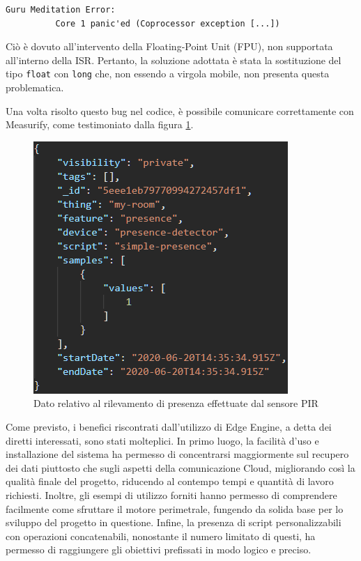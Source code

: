 \begin{verbatim}
Guru Meditation Error: 
          Core 1 panic'ed (Coprocessor exception [...])
\end{verbatim}

Ciò è dovuto all'intervento della Floating-Point Unit (FPU), non supportata all'interno della ISR. Pertanto, la soluzione adottata è stata la sostituzione del tipo \texttt{float} con \texttt{long} che, non essendo a virgola mobile, non presenta questa problematica.

Una volta risolto questo bug nel codice, è possibile comunicare correttamente con Measurify, come testimoniato dalla figura \ref{measacquario}.

\begin{figure}[H]
	\centering
	\includegraphics[width=0.6\linewidth]{pics/measacquario}
	\caption{Dato relativo al rilevamento di presenza effettuate dal sensore PIR}
	\label{measacquario}
\end{figure}

Come previsto, i benefici riscontrati dall'utilizzo di Edge Engine, a detta dei diretti interessati,  sono stati molteplici. In primo luogo, la facilità d'uso e installazione del sistema ha permesso di concentrarsi maggiormente sul recupero dei dati piuttosto che sugli aspetti della comunicazione Cloud, migliorando così la qualità finale del progetto, riducendo al contempo tempi e quantità di lavoro richiesti. Inoltre, gli esempi di utilizzo forniti hanno permesso di comprendere facilmente come sfruttare il motore perimetrale, fungendo da solida base per lo sviluppo del progetto in questione. Infine, la presenza di script personalizzabili con operazioni concatenabili, nonostante il numero limitato di questi, ha permesso di raggiungere gli obiettivi prefissati in modo logico e preciso.

